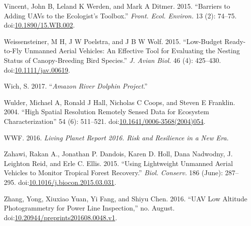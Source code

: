\documentclass[]{interact}
\theoremstyle{plain}%
\theoremstyle{definition}
\theoremstyle{remark}
\begin{document}
\hypertarget{ref-vincent_barriers_2015}{}
Vincent, John B, Leland K Werden, and Mark A Ditmer. 2015. ``Barriers to
Adding UAVs to the Ecologist's Toolbox.'' \emph{Front. Ecol. Environ.}
13 (2): 74--75.
doi:\href{https://doi.org/10.1890/15.WB.002}{10.1890/15.WB.002}.

\hypertarget{ref-weissensteiner_low-budget_2015}{}
Weissensteiner, M H, J W Poelstra, and J B W Wolf. 2015. ``Low-Budget
Ready-to-Fly Unmanned Aerial Vehicles: An Effective Tool for Evaluating
the Nesting Status of Canopy-Breeding Bird Species.'' \emph{J. Avian
Biol.} 46 (4): 425--430.
doi:\href{https://doi.org/10.1111/jav.00619}{10.1111/jav.00619}.

\hypertarget{ref-WichS2017}{}
Wich, S. 2017. ``\emph{Amazon River Dolphin Project}.''

\hypertarget{ref-wulder_high_2004}{}
Wulder, Michael A, Ronald J Hall, Nicholas C Coops, and Steven E
Franklin. 2004. ``High Spatial Resolution Remotely Sensed Data for
Ecosystem Characterization'' 54 (6): 511--521.
doi:\href{https://doi.org/10.1641/0006-3568(2004)054}{10.1641/0006-3568(2004)054}.

\hypertarget{ref-wwf_living_2016}{}
WWF. 2016. \emph{Living Planet Report 2016. Risk and Resilience in a New
Era.}

\hypertarget{ref-zahawi_using_2015}{}
Zahawi, Rakan A., Jonathan P. Dandois, Karen D. Holl, Dana Nadwodny, J.
Leighton Reid, and Erle C. Ellis. 2015. ``Using Lightweight Unmanned
Aerial Vehicles to Monitor Tropical Forest Recovery.'' \emph{Biol.
Conserv.} 186 (June): 287--295.
doi:\href{https://doi.org/10.1016/j.biocon.2015.03.031}{10.1016/j.biocon.2015.03.031}.

\hypertarget{ref-zhang_uav_2016}{}
Zhang, Yong, Xiuxiao Yuan, Yi Fang, and Shiyu Chen. 2016. ``UAV Low
Altitude Photogrammetry for Power Line Inspection,'' no. August.
doi:\href{https://doi.org/10.20944/preprints201608.0048.v1}{10.20944/preprints201608.0048.v1}.

\newpage
\singlespacing 
\end{document}
